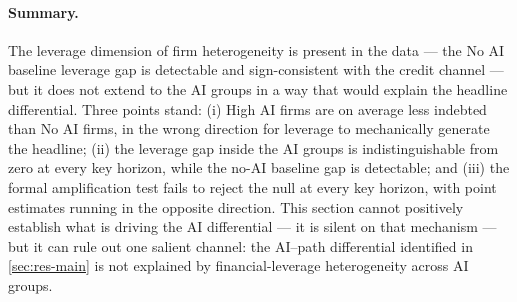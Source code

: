 \paragraph{Summary.} The leverage dimension of firm heterogeneity is
present in the data --- the No AI baseline leverage gap is
detectable and sign-consistent with the credit channel --- but it
does not extend to the AI groups in a way that would explain the
headline differential. Three points stand: (i) High AI firms are on
average less indebted than No AI firms, in the wrong direction for
leverage to mechanically generate the headline; (ii) the leverage
gap inside the AI groups is indistinguishable from zero at every key
horizon, while the no-AI baseline gap is detectable; and (iii) the
formal amplification test fails to reject the null at every key
horizon, with point estimates running in the opposite direction.
This section cannot positively establish what is driving the AI
differential --- it is silent on that mechanism --- but it can rule
out one salient channel: the AI--path differential identified in
\cref{sec:res-main} is not explained by financial-leverage
heterogeneity across AI groups.